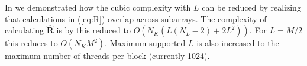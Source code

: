 \documentclass[journal]{IEEEtran}
\newcommand{\mat}[1]{\mathbf{#1}}
\renewcommand{\vec}[1]{\mathbf{#1}}
\begin{document}
In \cite{asen2012, Buskenes} we demonstrated how the cubic complexity with $L$ %
can be reduced by realizing that calculations in (\ref{eq:R}) overlap across subarrays. %
The complexity of calculating $\mat{\hat{R}}$ is by this reduced to $O(N_K(L(N_L-2)+2L^2))$. For $L=M/2$ this reduces to $O(N_KM^2)$.
Maximum supported $L$ is also increased to the maximum number of threads per block (currently 1024). %

\end{document}
